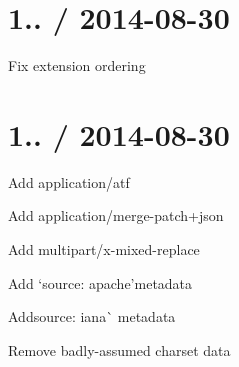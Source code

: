 \section*{1.. / 2014-\/08-\/30 }


\begin{DoxyItemize}
\item Fix extension ordering
\end{DoxyItemize}

\section*{1.. / 2014-\/08-\/30 }


\begin{DoxyItemize}
\item Add {\ttfamily application/atf}
\item Add {\ttfamily application/merge-\/patch+json}
\item Add {\ttfamily multipart/x-\/mixed-\/replace}
\item Add `source\+: \textquotesingle{}apache'{\ttfamily metadata}
\item {\ttfamily Add}source\+: \textquotesingle{}iana\textquotesingle{}\`{} metadata
\item Remove badly-\/assumed charset data 
\end{DoxyItemize}